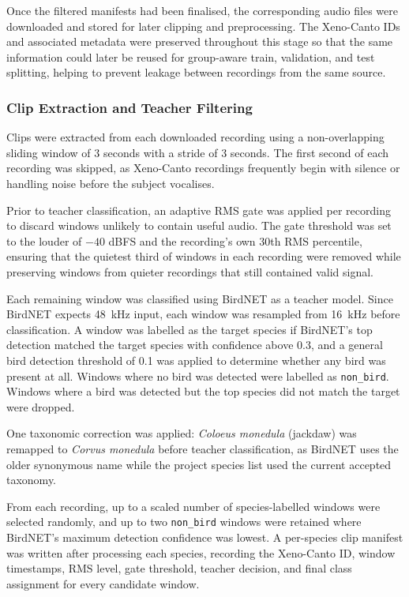 \documentclass[conference]{IEEEtran}
\begin{document}
Once the filtered manifests had been finalised, the corresponding audio files were downloaded and stored for later clipping and preprocessing. The Xeno-Canto IDs and associated metadata were preserved throughout this stage so that the same information could later be reused for group-aware train, validation, and test splitting, helping to prevent leakage between recordings from the same source.

\subsubsection{Clip Extraction and Teacher Filtering}
Clips were extracted from each downloaded recording using a non-overlapping sliding window of 3 seconds with a stride of 3 seconds. The first second of each recording was skipped, as Xeno-Canto recordings frequently begin with silence or handling noise before the subject vocalises.

Prior to teacher classification, an adaptive RMS gate was applied per recording to discard windows unlikely to contain useful audio. The gate threshold was set to the louder of $-40$ dBFS and the recording's own 30th RMS percentile, ensuring that the quietest third of windows in each recording were removed while preserving windows from quieter recordings that still contained valid signal.

Each remaining window was classified using BirdNET as a teacher model. Since BirdNET expects 48~kHz input, each window was resampled from 16~kHz before classification. A window was labelled as the target species if BirdNET's top detection matched the target species with confidence above 0.3, and a general bird detection threshold of 0.1 was applied to determine whether any bird was present at all. Windows where no bird was detected were labelled as \texttt{non\_bird}. Windows where a bird was detected but the top species did not match the target were dropped.

One taxonomic correction was applied: \textit{Coloeus monedula} (jackdaw) was remapped to \textit{Corvus monedula} before teacher classification, as BirdNET uses the older synonymous name while the project species list used the current accepted taxonomy.

From each recording, up to a scaled number of species-labelled windows were selected randomly, and up to two \texttt{non\_bird} windows were retained where BirdNET's maximum detection confidence was lowest. A per-species clip manifest was written after processing each species, recording the Xeno-Canto ID, window timestamps, RMS level, gate threshold, teacher decision, and final class assignment for every candidate window.
\end{document}
